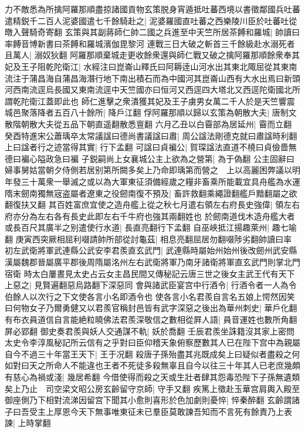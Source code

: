 力不敵悉為所擒阿羅那順盡掠諸國貢物玄策脱身宵遁抵吐蕃西境以書徵鄰國兵吐蕃遣精鋭千二百人泥婆國遣七千餘騎赴之|{
	泥婆羅國直吐蕃之西樂陵川臣於吐蕃吐從暾入聲騎奇寄翻}
玄策與其副蔣師仁帥二國之兵進至中天竺所居茶餺和羅城|{
	帥讀曰率餺音博新書曰茶餺和羅城濱伽毘黎河}
連戰三日大破之斬首三千餘級赴水溺死者且萬人|{
	溺奴狄翻}
阿羅那順棄城走更收餘衆還與師仁戰又破之擒阿羅那順餘衆奉其妃及王子阻乾陀衛江|{
	水經注曰崑崙山釋氏曰阿耨逹山河水出其東北陬屈從其東南流注于蒲昌海自蒲昌海潛行地下南出積石而為中國河其崑崙山西有大水出焉曰新頭河西南流逕烏長國又東南流逕中天竺國亦曰恒河又西逕四大塔北又西逕陀衛國北所謂乾陀衛江蓋即此也}
師仁進擊之衆潰獲其妃及王子虜男女萬二千人於是天竺響震城邑聚落降者五百八十餘所|{
	降戶江翻}
俘阿羅那順以歸以玄策為朝散大夫|{
	唐制文散階朝散大夫從五品下朝直遥翻散悉亶翻}
六月乙丑以白霫部為居延州|{
	霫而立翻}
癸酉特進宋公蕭瑀卒太常議諡曰德尚書議諡曰肅|{
	周公諡法剛德克就曰肅諡時利翻}
上曰諡者行之迹當得其實|{
	行下孟翻}
可諡曰貞褊公|{
	賀琛諡法直道不橈曰貞儉嗇無德曰褊心隘政急曰褊}
子鋭嗣尚上女襄城公主上欲為之營第|{
	為于偽翻}
公主固辭曰婦事舅姑當朝夕侍側若居别第所闕多矣上乃命即瑀第而營之　上以高麗困弊議以明年發三十萬衆一舉滅之或以為大軍東征須備經歲之糧非畜乘所能載宜具舟艦為水運隋末劒南獨無宼盗屬者遼東之役劒南復不預及|{
	畜許救翻乘繩證翻艦戶黯翻屬之欲翻復扶又翻}
其百姓富庶宜使之造舟艦上從之秋七月遣右領左右府長史強偉|{
	領左右府亦分為左右各有長史此即左右千牛府也強其兩翻姓也}
於劒南道伐木造舟艦大者或長百尺其廣半之别遣使行水道|{
	長直亮翻行下孟翻}
自巫峽抵江揚趣萊州|{
	趣七喻翻}
庚寅西突厥相屈利啜請帥所部從討龜茲|{
	相息亮翻屈居勿翻啜陟劣翻帥讀曰率}
初左武衛將軍武連縣公武安李君羨直玄武門|{
	武連縣時屬始州始州後改劒州武安縣漢屬魏郡晉屬廣平郡後周隋屬洺州左右武衛將軍乃南牙諸衛將軍直玄武門則掌北門宿衛}
時太白屢晝見太史占云女主昌民間又傳秘記云唐三世之後女主武王代有天下上惡之|{
	見賢遍翻惡烏路翻下深惡同}
會與諸武臣宴宫中行酒令|{
	行酒令者一人為令伯餘人以次行之下文使各言小名即酒令也}
使各言小名君羨自言名五娘上愕然因笑曰何物女子乃爾勇健又以君羨官稱封邑皆有武字深惡之後出為華州刺史|{
	華戶化翻}
有布衣員道信自言能絶粒曉佛法君羨深敬信之數相從屛人語|{
	員音運姓也數所角翻屏必郢翻}
御史奏君羨與妖人交通謀不軌|{
	妖於喬翻}
壬辰君羨坐誅籍沒其家上密問太史令李淳風秘記所云信有之乎對曰臣仰稽天象俯察歷數其人已在陛下宫中為親屬自今不過三十年當王天下|{
	王于况翻}
殺唐子孫殆盡其兆既成矣上曰疑似者盡殺之何如對曰天之所命人不能違也王者不死徒多殺無辜且自今以往三十年其人已老庶幾頗有慈心為禍或淺|{
	幾居希翻}
今借使得而殺之天或生壯者肆其怨毒恐陛下子孫無遺類矣上乃止　司空梁文昭公房玄齡留守京師|{
	守手又翻}
疾篤上徵赴玉華宫肩輿入殿至御座側乃下相對流涕因留宫下聞其小愈則喜形於色加劇則憂悴|{
	悴秦醉翻}
玄齡謂諸子曰吾受主上厚恩今天下無事唯東征未已羣臣莫敢諫吾知而不言死有餘責乃上表諫|{
	上時掌翻}
